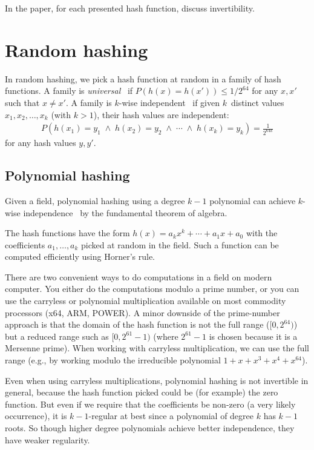 \documentclass{article}
\begin{document}
In the paper, for each presented hash function, discuss invertibility.





\section{Random hashing}


In random hashing, 
we pick a hash function  at random in a family of
hash functions.  A family  is
  \emph{universal}~\cite{carter1979universal} if
 $P\left (h(x)=h(x')\right )\leq 1/2^64$
for any $x,x'$ such that $x \neq x'$.
A family is $k$-wise independent~\cite{lemi:one-pass-journal,Lemire2012604} if given  $k$~distinct values $x_1,x_2, \ldots, x_k$ (with $k>1$), their hash
values are independent: \begin{eqnarray*}
P\left (h(x_1)= y_1  \; \land  \; h(x_2)= y_2 \; \land  \; \cdots \; \land  \; h(x_k)= y_k  \right ) =\frac{1}{2^{64k}}\end{eqnarray*}
for any hash values $y,y'$. 

\subsection{Polynomial hashing}
Given a field, polynomial hashing using a degree $k-1$ polynomial can achieve $k$-wise independence~\cite{carter1979universal,Thorup:2004:TBH:982792.982884} by the fundamental theorem of algebra.

The hash functions have the form $h(x)=a_{k} x^{k} + \cdots + a_{1} x + a_0$ with the coefficients $a_1, \ldots, a_k$ picked at random in the field. Such a function can be computed efficiently using Horner's rule.

There are two convenient ways to do computations in a field on modern computer. You either do the computations modulo a prime number, or you can use the carryless or polynomial multiplication available on most commodity processors (x64, ARM, POWER). A minor downside of the prime-number approach is that the domain of the hash function is not the full range ($[0,2^{64})$) but a reduced range such as $[0, 2^{61}-1)$ (where $2^{61}-1$ is chosen because it is a Mersenne prime). When working with carryless multiplication, we can use the full range (e.g., by working modulo the irreducible polynomial $1+x+x^3+x^4+x^{64}$).

Even when using carryless multiplications,  polynomial hashing is not invertible in general, because the hash function picked could be (for example) the zero function. But even if we require that the coefficients be non-zero (a very likely occurrence), it is $k-1$-regular at best since a polynomial of degree $k$ has $k-1$ roots. So though higher degree polynomials achieve better independence, they have weaker regularity.
\end{document}
